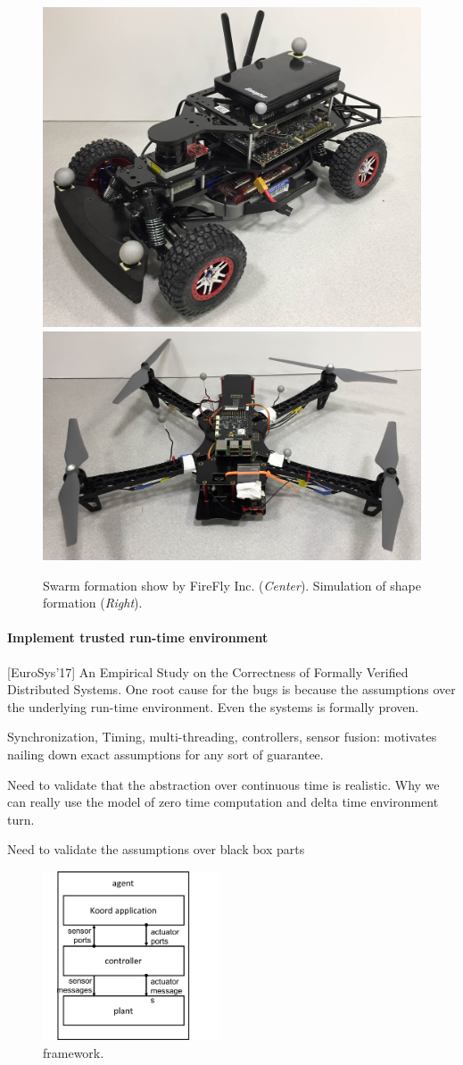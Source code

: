 \begin{figure}[h!]
\begin{minipage}{0.55\columnwidth}
	\includegraphics[width=0.4\linewidth]{figs/car.jpg}
	\includegraphics[width=0.55\linewidth]{figs/quad.jpg}
\end{minipage}%
	\caption{Swarm formation show by FireFly Inc. (\emph{Center}). Simulation of shape formation (\emph{Right}).}
    \label{fig:firefly}
\end{figure}

\paragraph{Implement trusted run-time environment}


[EuroSys'17] An Empirical Study on the Correctness of Formally Verified Distributed Systems.
One root cause for the bugs is because the assumptions over the underlying run-time environment. Even the systems is formally proven.

Synchronization, Timing, multi-threading, controllers, sensor fusion:
motivates nailing down exact assumptions for any sort of guarantee.

Need to validate that the abstraction over continuous time is realistic.
Why we can really use the model of zero time computation and delta time environment turn.

Need to validate the assumptions over black box parts


\begin{figure}[h!]
\centering
\includegraphics[height=5cm]{figs/arch.png}
\caption{\toolname framework.}
\label{fig:arch}
\end{figure}

